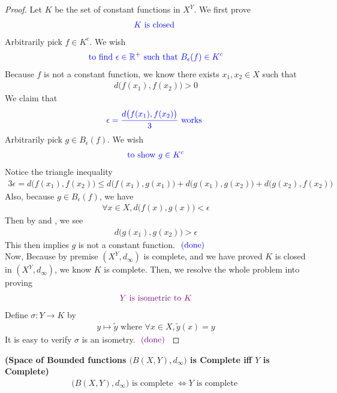 \documentclass{report}
\begin{document}
\begin{proof}
Let $K$ be the set of constant functions  in $X^Y$. We first prove 
 \begin{align*}
\textcolor{blue}{K\text{ is closed }}
\end{align*}
Arbitrarily pick $f \in K^c$. We wish 
\begin{align*}
\textcolor{blue}{\text{ to find $\epsilon \in\mathbb{R}^+$ such that $B_{\epsilon }(f) \in K^c$ }}
\end{align*}
Because $f$ is not a constant function, we know there exists $x_1,x_2 \in X$ such that 
\begin{align*}
d\big(f(x_1),f(x_2) \big)>0
\end{align*}
We claim that 
\begin{align*}
\textcolor{blue}{\epsilon=\frac{d\big(f(x_1),f(x_2) \big)}{3}\text{ works }}
\end{align*}
Arbitrarily pick $g \in B_\epsilon(f)$. We wish 
\begin{align*}
\textcolor{blue}{\text{ to show $g\in K^c$  }}
\end{align*}
Notice the triangle inequality 
\begin{align}
\label{K7}
3\epsilon =d\big(f(x_1),f(x_2) \big)\leq d\big(f(x_1),g(x_1) \big)+d\big(g(x_1),g(x_2) \big)+d\big(g(x_2),f(x_2) \big)
\end{align}
Also, because $g\in B_\epsilon (f)$, we have
\begin{align}
  \label{K8}
\forall x\in X, d\big(f(x),g(x) \big)<\epsilon 
\end{align}
Then by  and , we see 
\begin{align*}
d\big(g(x_1),g(x_2) \big)> \epsilon 
\end{align*}
This then implies $g$ is not a constant function.  $\textcolor{blue}{\text{ (done) }}$\\

Now, Because by premise $(X^Y,d_{\infty})$ is complete, and we have proved $K$ is closed in  $(X^Y,d_\infty)$, we know $K$ is complete. Then, we resolve the whole problem into proving 
\begin{align*}
\textcolor{violet}{Y \text{ is isometric to }K}
\end{align*}
Define $\sigma:Y \to K $ by 
\begin{align*}
y \mapsto \tilde{y}\text{ where }\forall x \in X, \tilde{y}(x)=y 
\end{align*}
It is easy to verify $\sigma$ is an isometry. $\textcolor{violet}{\text{ (done) }}$ 
\end{proof}
\begin{corollary}
\label{SoB}
\textbf{(Space of Bounded functions $\big(B(X,Y),d_{\infty} \big)$ is Complete iff  $Y$ is Complete)} 
\begin{align*}
\big(B(X,Y),d_\infty \big)\text{ is complete }\iff  Y\text{ is complete }
\end{align*}
\end{corollary}
\end{document}
